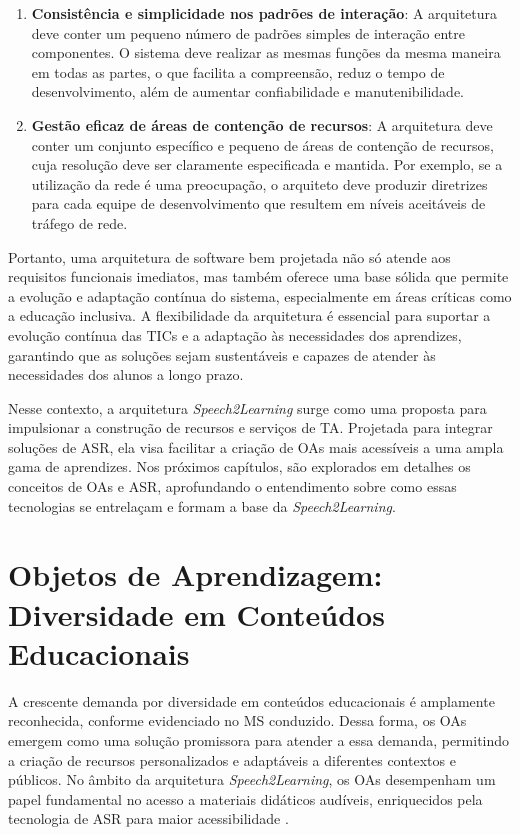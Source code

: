 \begin{enumerate}
    \item \textbf{Consistência e simplicidade nos padrões de interação}: A arquitetura deve conter um pequeno número de padrões simples de interação entre componentes. O sistema deve realizar as mesmas funções da mesma maneira em todas as partes, o que facilita a compreensão, reduz o tempo de desenvolvimento, além de aumentar confiabilidade e manutenibilidade.
    
    \item \textbf{Gestão eficaz de áreas de contenção de recursos}: A arquitetura deve conter um conjunto específico e pequeno de áreas de contenção de recursos, cuja resolução deve ser claramente especificada e mantida. Por exemplo, se a utilização da rede é uma preocupação, o arquiteto deve produzir diretrizes para cada equipe de desenvolvimento que resultem em níveis aceitáveis de tráfego de rede.
\end{enumerate}

Portanto, uma arquitetura de software bem projetada não só atende aos requisitos funcionais imediatos, mas também oferece uma base sólida que permite a evolução e adaptação contínua do sistema, especialmente em áreas críticas como a educação inclusiva. A flexibilidade da arquitetura é essencial para suportar a evolução contínua das TICs e a adaptação às necessidades dos aprendizes, garantindo que as soluções sejam sustentáveis e capazes de atender às necessidades dos alunos a longo prazo.

Nesse contexto, a arquitetura \textit{Speech2Learning} surge como uma proposta para impulsionar a construção de recursos e serviços de TA. Projetada para integrar soluções de ASR, ela visa facilitar a criação de OAs mais acessíveis a uma ampla gama de aprendizes. Nos próximos capítulos, são explorados em detalhes os conceitos de OAs e ASR, aprofundando o entendimento sobre como essas tecnologias se entrelaçam e formam a base da \textit{Speech2Learning}.

\section{Objetos de Aprendizagem: Diversidade em Conteúdos Educacionais}
\label{section:foundation:lo}

A crescente demanda por diversidade em conteúdos educacionais é amplamente reconhecida, conforme evidenciado no MS conduzido. Dessa forma, os OAs emergem como uma solução promissora para atender a essa demanda, permitindo a criação de recursos personalizados e adaptáveis a diferentes contextos e públicos. No âmbito da arquitetura \textit{Speech2Learning}, os OAs desempenham um papel fundamental no acesso a materiais didáticos audíveis, enriquecidos pela tecnologia de ASR para maior acessibilidade \cite{FalvoJr2023_HICSS}.

